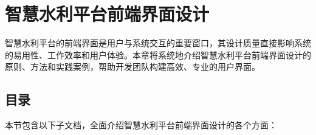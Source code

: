 \section{智慧水利平台前端界面设计}\label{ux667aux6167ux6c34ux5229ux5e73ux53f0ux524dux7aefux754cux9762ux8bbeux8ba1}

智慧水利平台的前端界面是用户与系统交互的重要窗口，其设计质量直接影响系统的易用性、工作效率和用户体验。本章将系统地介绍智慧水利平台前端界面设计的原则、方法和实践案例，帮助开发团队构建高效、专业的用户界面。

\subsection{目录}\label{ux76eeux5f55}

本节包含以下子文档，全面介绍智慧水利平台前端界面设计的各个方面：

